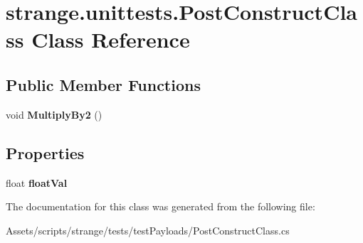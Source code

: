 \hypertarget{classstrange_1_1unittests_1_1_post_construct_class}{\section{strange.\-unittests.\-Post\-Construct\-Class Class Reference}
\label{classstrange_1_1unittests_1_1_post_construct_class}
}
\subsection*{Public Member Functions}
\begin{DoxyCompactItemize}
\item 
\hypertarget{classstrange_1_1unittests_1_1_post_construct_class_a5fee211cac40406ae79ba94a5c0f8a84}{void {\bfseries Multiply\-By2} ()}\label{classstrange_1_1unittests_1_1_post_construct_class_a5fee211cac40406ae79ba94a5c0f8a84}

\end{DoxyCompactItemize}
\subsection*{Properties}
\begin{DoxyCompactItemize}
\item 
\hypertarget{classstrange_1_1unittests_1_1_post_construct_class_a747ee47a09fd8a7e18f72db64c65f2b6}{float {\bfseries float\-Val}}\label{classstrange_1_1unittests_1_1_post_construct_class_a747ee47a09fd8a7e18f72db64c65f2b6}

\end{DoxyCompactItemize}


The documentation for this class was generated from the following file\-:\begin{DoxyCompactItemize}
\item 
Assets/scripts/strange/tests/test\-Payloads/Post\-Construct\-Class.\-cs\end{DoxyCompactItemize}
